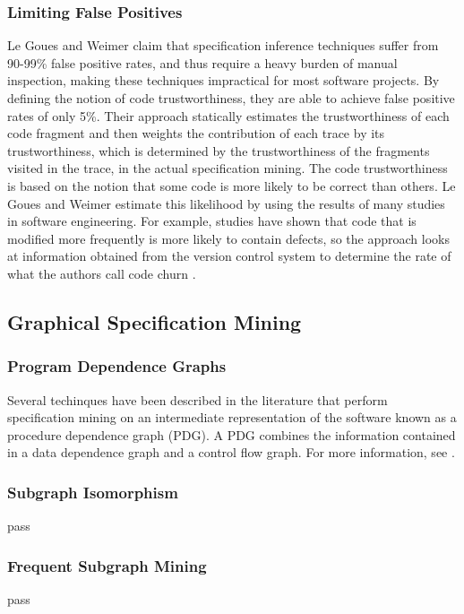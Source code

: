 \documentclass[12pt]{article}
\begin{document}
\subsubsection{Limiting False Positives}
Le Goues and Weimer\cite{Goues:2009:SMF:1532891.1532925} claim that
specification inference techniques suffer from 90-99\% false positive rates,
and thus require a heavy burden of manual inspection, making these techniques
impractical for most software projects. By defining the notion of code
trustworthiness, they are able to achieve false positive rates of only 5\%.
Their approach statically estimates the trustworthiness of each code fragment
and then weights the contribution of each trace by its trustworthiness, which
is determined by the trustworthiness of the fragments visited in the trace, in
the actual specification mining\cite{Goues:2009:SMF:1532891.1532925}. The code
trustworthiness is based on the notion that some code is more likely to be
correct than others. Le Goues and Weimer estimate this likelihood by using the
results of many studies in software engineering. For example, studies have
shown that code that is modified more frequently is more likely to contain
defects, so the approach looks at information obtained from the version control
system to determine the rate of what the authors call code churn
\cite{Goues:2009:SMF:1532891.1532925}.

\subsection{Graphical Specification Mining}
\subsubsection{Program Dependence Graphs}
Several techinques have been described in the literature that perform
specification mining on an intermediate representation of the software known
as a procedure dependence graph (PDG). A PDG combines the information contained
in a data dependence graph and a control flow graph. For more information, see
\cite{Ferrante:1987:PDG:24039.24041}.

\subsubsection{Subgraph Isomorphism}
pass

\subsubsection{Frequent Subgraph Mining}
pass %
\end{document}
